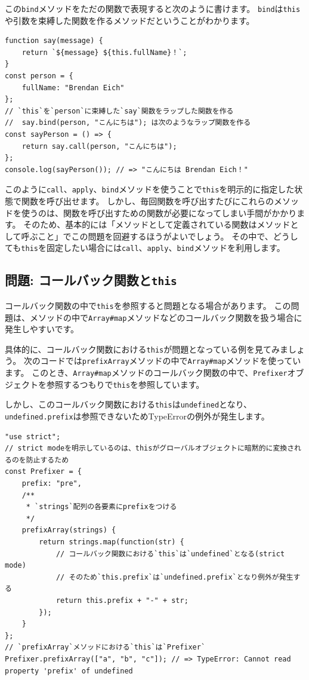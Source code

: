 この\texttt{bind}メソッドをただの関数で表現すると次のように書けます。
\texttt{bind}は\texttt{this}や引数を束縛した関数を作るメソッドだということがわかります。

\begin{lstlisting}
function say(message) {
    return `${message} ${this.fullName}！`;
}
const person = {
    fullName: "Brendan Eich"
};
// `this`を`person`に束縛した`say`関数をラップした関数を作る
//  say.bind(person, "こんにちは"); は次のようなラップ関数を作る
const sayPerson = () => {
    return say.call(person, "こんにちは");
};
console.log(sayPerson()); // => "こんにちは Brendan Eich！"
\end{lstlisting}

このように\texttt{call}、\texttt{apply}、\texttt{bind}メソッドを使うことで\texttt{this}を明示的に指定した状態で関数を呼び出せます。
しかし、毎回関数を呼び出すたびにこれらのメソッドを使うのは、関数を呼び出すための関数が必要になってしまい手間がかかります。
そのため、基本的には「メソッドとして定義されている関数はメソッドとして呼ぶこと」でこの問題を回避するほうがよいでしょう。
その中で、どうしても\texttt{this}を固定したい場合には\texttt{call}、\texttt{apply}、\texttt{bind}メソッドを利用します。

\hypertarget{callback-and-this}{%
\subsection{\texorpdfstring{問題:
コールバック関数と\texttt{this}}{問題: コールバック関数とthis}}\label{callback-and-this}}

コールバック関数の中で\texttt{this}を参照すると問題となる場合があります。
この問題は、メソッドの中で\texttt{Array\#map}メソッドなどのコールバック関数を扱う場合に発生しやすいです。

具体的に、コールバック関数における\texttt{this}が問題となっている例を見てみましょう。
次のコードでは\texttt{prefixArray}メソッドの中で\texttt{Array\#map}メソッドを使っています。
このとき、\texttt{Array\#map}メソッドのコールバック関数の中で、\texttt{Prefixer}オブジェクトを参照するつもりで\texttt{this}を参照しています。

しかし、このコールバック関数における\texttt{this}は\texttt{undefined}となり、\texttt{undefined.prefix}は参照できないためTypeErrorの例外が発生します。

\begin{lstlisting}
"use strict";
// strict modeを明示しているのは、thisがグローバルオブジェクトに暗黙的に変換されるのを防止するため
const Prefixer = {
    prefix: "pre",
    /**
     * `strings`配列の各要素にprefixをつける
     */
    prefixArray(strings) {
        return strings.map(function(str) {
            // コールバック関数における`this`は`undefined`となる(strict mode)
            // そのため`this.prefix`は`undefined.prefix`となり例外が発生する
            return this.prefix + "-" + str;
        });
    }
};
// `prefixArray`メソッドにおける`this`は`Prefixer`
Prefixer.prefixArray(["a", "b", "c"]); // => TypeError: Cannot read property 'prefix' of undefined
\end{lstlisting}

